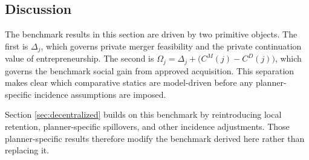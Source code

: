 \subsection{Discussion}

The benchmark results in this section are driven by two primitive objects. The first is $\Delta_j$, which governs private merger feasibility and the private continuation value of entrepreneurship. The second is $\Omega_j=\Delta_j+\bigl(C^M(j)-C^D(j)\bigr)$, which governs the benchmark social gain from approved acquisition. This separation makes clear which comparative statics are model-driven before any planner-specific incidence assumptions are imposed.

Section \ref{sec:decentralized} builds on this benchmark by reintroducing local retention, planner-specific spillovers, and other incidence adjustments. Those planner-specific results therefore modify the benchmark derived here rather than replacing it.
